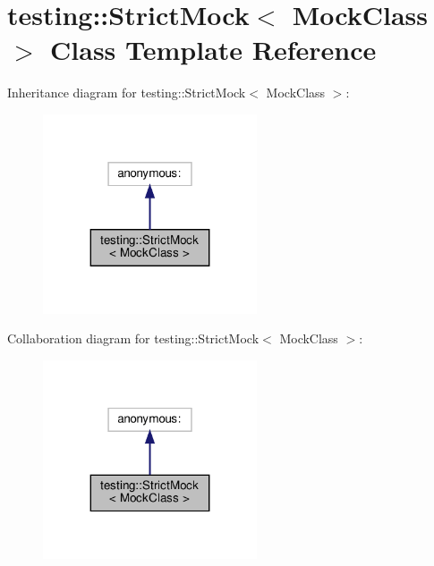 \hypertarget{classtesting_1_1_strict_mock}{}\section{testing\+:\+:Strict\+Mock$<$ Mock\+Class $>$ Class Template Reference}
\label{classtesting_1_1_strict_mock}


Inheritance diagram for testing\+:\+:Strict\+Mock$<$ Mock\+Class $>$\+:
\nopagebreak
\begin{figure}[H]
\begin{center}
\leavevmode
\includegraphics[width=179pt]{classtesting_1_1_strict_mock__inherit__graph}
\end{center}
\end{figure}


Collaboration diagram for testing\+:\+:Strict\+Mock$<$ Mock\+Class $>$\+:
\nopagebreak
\begin{figure}[H]
\begin{center}
\leavevmode
\includegraphics[width=179pt]{classtesting_1_1_strict_mock__coll__graph}
\end{center}
\end{figure}
